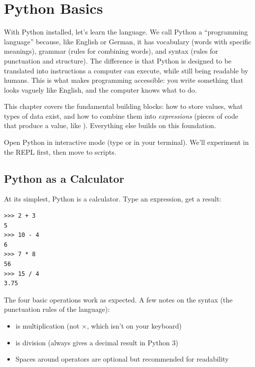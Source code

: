 
\chapter{Python Basics}
\label{chap:basics}

With Python installed, let's learn the language. We call Python a ``programming language'' because, like English or German, it has vocabulary (words with specific meanings), grammar (rules for combining words), and syntax (rules for punctuation and structure). The difference is that Python is designed to be translated into instructions a computer can execute, while still being readable by humans. This is what makes programming accessible: you write something that looks vaguely like English, and the computer knows what to do.

This chapter covers the fundamental building blocks: how to store values, what types of data exist, and how to combine them into \emph{expressions} (pieces of code that produce a value, like ). Everything else builds on this foundation.

Open Python in interactive mode (type  or  in your terminal). We'll experiment in the REPL first, then move to scripts.

\section{Python as a Calculator}
\label{sec:calculator}

At its simplest, Python is a calculator. Type an expression, get a result:

\begin{lstlisting}
>>> 2 + 3
5
>>> 10 - 4
6
>>> 7 * 8
56
>>> 15 / 4
3.75
\end{lstlisting}

The four basic operations work as expected. A few notes on the syntax (the punctuation rules of the language):

\begin{itemize}
    \item \py{*} is multiplication (not $\times$, which isn't on your keyboard)
    \item \py{/} is division (always gives a decimal result in Python 3)
    \item Spaces around operators are optional but recommended for readability
\end{itemize}


